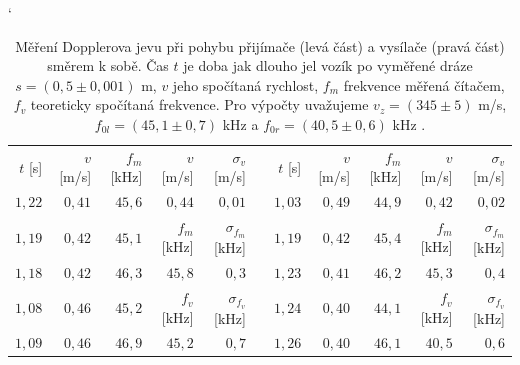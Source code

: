 \documentclass[english]{article}
\begin{document}
	\begin{table}[h]
	\catcode` %
	\begin{center}
	\begin{tabular}{|r|r|r||r|r|c|r|r|r||r|r|}
    \cline{1-5} \cline{7-11}
 	
 	$t$ [s] & $v$ [m/s] & $f_m$ [kHz] & $v$ [m/s] & $\sigma_v$ [m/s]  && $t$ [s] & $v$ [m/s] & $f_m$ [kHz] & $v$ [m/s] & $\sigma_v$ [m/s]   \\\cline{1-5} \cline{7-11}
	$1,22$ & $0,41$ & $45,6$ & $0,44$ & $0,01$ 						  && $1,03$ & $0,49$ & $44,9$ & $0,42$ & $0,02$ 						\\\cline{1-5} \cline{7-11}
	$1,19$ & $0,42$ & $45,1$ & $f_m$ [kHz] & $\sigma_{f_m}$ [kHz] 	  && $1,19$ & $0,42$ & $45,4$ & $f_m$ [kHz] & $\sigma_{f_m}$ [kHz]		\\\cline{1-5} \cline{7-11}
	$1,18$ & $0,42$ & $46,3$ & $45,8$ & $0,3$					 	  && $1,23$ & $0,41$ & $46,2$ & $45,3$ & $0,4$ 							\\\cline{1-5} \cline{7-11}
	$1,08$ & $0,46$ & $45,2$ & $f_v$ [kHz] & $\sigma_{f_v}$ [kHz]     && $1,24$ & $0,40$ & $44,1$ & $f_v$ [kHz] & $\sigma_{f_v}$ [kHz] 		\\\cline{1-5} \cline{7-11}
	$1,09$ & $0,46$ & $46,9$ & $45,2$ & $0,7$                         && $1,26$ & $0,40$ & $46,1$ & $40,5$ & $0,6$ 							\\\cline{1-5} \cline{7-11}
 	 
	\end{tabular}
	\caption{Měření Dopplerova jevu při pohybu přijímače (levá část) a vysílače (pravá část) směrem k sobě. Čas $t$ je doba jak dlouho jel vozík po vyměřené dráze $s = (0,5 \pm 0,001)$ m, $v$ jeho spočítaná rychlost, $f_m$ frekvence měřená čítačem, $f_v$ teoreticky spočítaná frekvence. Pro výpočty uvažujeme $v_z = (345 \pm 5)$ m/s, $f_{0l} = (45,1 \pm 0,7)$ kHz a $f_{0r} = (40,5 \pm 0,6)$ kHz \cite{bib:chyby}.
	}
	\label{tab:doppler_k_sobe}
	\end{center}
	\end{table}
	
\end{document}
